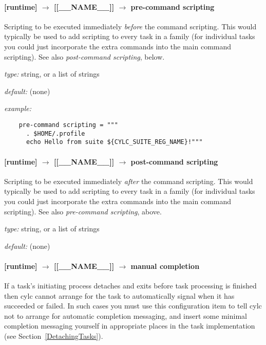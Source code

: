 \paragraph[pre-command scripting]{ [runtime] $\rightarrow$ [[\_\_NAME\_\_]] $\rightarrow$ pre-command scripting}

Scripting to be executed immediately {\em before} the command scripting.
This would typically be used to add scripting to every task in a family
(for individual tasks you could just incorporate the extra commands into
the main command scripting). See also {\em post-command scripting},
below.

\begin{myitemize}
\item {\em type:} string, or a list of strings
\item {\em default:} (none)
\item {\em example:} 
 \begin{lstlisting}
    pre-command scripting = """
      . $HOME/.profile
      echo Hello from suite ${CYLC_SUITE_REG_NAME}!"""
 \end{lstlisting}
\end{myitemize}

\paragraph[post-command scripting]{ [runtime] $\rightarrow$ [[\_\_NAME\_\_]] $\rightarrow$ post-command scripting}

Scripting to be executed immediately {\em after} the command scripting.
This would typically be used to add scripting to every task in a family
(for individual tasks you could just incorporate the extra commands into
the main command scripting). See also {\em pre-command scripting},
above.

\begin{myitemize}
\item {\em type:} string, or a list of strings
\item {\em default:} (none)
\end{myitemize}

\paragraph[manual completion]{ [runtime] $\rightarrow$ [[\_\_NAME\_\_]] $\rightarrow$ manual completion}

If a task's initiating process detaches and exits before task processing
is finished then cylc cannot arrange for the task to automatically
signal when it has succeeded or failed. In such cases you must use this 
configuration item to tell cylc not to arrange for automatic completion
messaging, and insert some minimal completion messaging yourself in
appropriate places in the task implementation (see
Section~\ref{DetachingTasks}).


